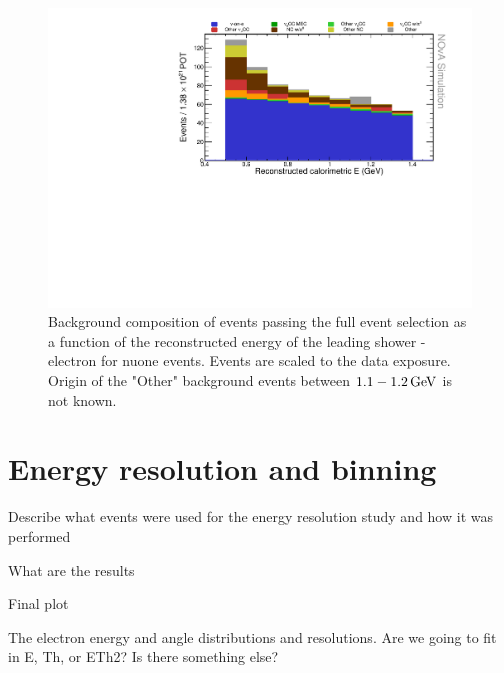 \begin{figure}[hbtp]
\centering
\includegraphics[width=\textwidth]{Plots/NuMMEventSelection/N1Cut_calESignal.pdf}
\caption[Background composition of final selection]{Background composition of events passing the full event selection as a function of the reconstructed energy of the leading shower - electron for \acrshort{nuone} events. Events are scaled to the data exposure. Origin of the "Other" background events between $\unit[1.1-1.2]{GeV}$ is not known.}
\label{fig:NuMMBackgroundDecomposition}
\end{figure}


\iffalse
\section{Energy resolution and binning}\label{sec:NuMMResolution}
Describe what events were used for the energy resolution study and how it was performed

What are the results

Final plot

The electron energy and angle distributions and resolutions. Are we going to fit in E, Th, or ETh2? Is there something else?

